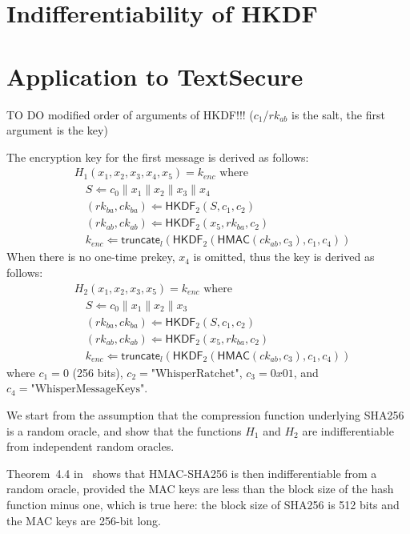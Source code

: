 \documentclass[compsoc, conference, letterpaper, 10pt, times]{IEEEtran}
\newcommand{\HMAC}{\mathsf{HMAC}}
\newcommand{\HKDF}{\mathsf{HKDF}}
\newcommand{\e}{\mathit{enc}}
\newcommand{\rk}{\mathit{rk}}
\newcommand{\ck}{\mathit{ck}}
\newcommand{\truncate}{\mathsf{truncate}}
\begin{document}
\section{Indifferentiability of HKDF}

\section{Application to TextSecure}

TO DO modified order of arguments of HKDF!!! ($c_1$/$\rk_{ab}$ is the salt,
the first argument is the key)

The encryption key for the first message is derived as follows:
\begin{align*}
&H_1(x_1, x_2, x_3, x_4, x_5) = k_{\e}\text{ where}\\
&\quad  S \Leftarrow c_0 \| x_1 \| x_2 \| x_3 \| x_4\\
&\quad  (\rk_{ba}, \ck_{ba}) \Leftarrow \HKDF_2(S, c_1, c_2)\\
&\quad  (\rk_{ab}, \ck_{ab}) \Leftarrow \HKDF_2(x_5, \rk_{ba}, c_2)\\
&\quad  k_{\e} \Leftarrow \truncate_l(\HKDF_2(\HMAC(\ck_{ab}, c_3), c_1, c_4))
\end{align*}
When there is no one-time prekey, $x_4$ is omitted, thus the key
is derived as follows:
\begin{align*}
&H_2(x_1, x_2, x_3, x_5) = k_{\e}\text{ where}\\
&\quad  S \Leftarrow c_0 \| x_1 \| x_2 \| x_3\\
&\quad  (\rk_{ba}, \ck_{ba}) \Leftarrow \HKDF_2(S, c_1, c_2)\\
&\quad  (\rk_{ab}, \ck_{ab}) \Leftarrow \HKDF_2(x_5, \rk_{ba}, c_2)\\
&\quad  k_{\e} \Leftarrow \truncate_l(\HKDF_2(\HMAC(\ck_{ab}, c_3), c_1, c_4))
\end{align*}
where $c_1 = 0$ (256 bits), $c_2 = \text{"WhisperRatchet"}$,
$c_3 = 0x01$, and $c_4 = \text{"WhisperMessageKeys"}$.



We start from the assumption that the compression function underlying SHA256 is a random oracle, and show that the functions $H_1$ and $H_2$ are
indifferentiable from independent random oracles.


Theorem~4.4 in~\cite{Dodis12} shows that HMAC-SHA256 is then indifferentiable from a random oracle, provided the MAC keys are less than the block size of the hash function minus one, which is true here: the block size of SHA256 is 512 bits and the MAC keys are 256-bit long.
\end{document}
